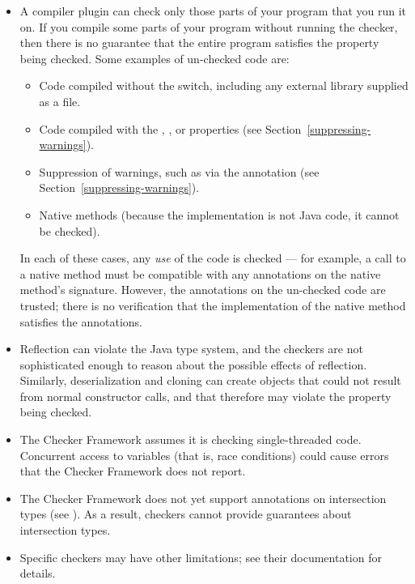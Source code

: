 \begin{itemize}

\item
  A compiler plugin can check only those parts of your program that you run
  it on.  If you compile some parts of your program without running the
  checker, then there is no guarantee that the entire program satisfies the
  property being checked.  Some examples of un-checked code are:

  \begin{itemize}
  \item
    Code compiled without the  switch, including any
    external library supplied as a  file.
  \item
    Code compiled with the , ,  or 
    properties (see Section~\ref{suppressing-warnings}).
  \item
    Suppression of warnings, such as via the 
    annotation (see Section~\ref{suppressing-warnings}).
  \item
    Native methods (because the implementation is not Java code, it cannot
    be checked).
  \end{itemize}

  In each of these cases, any \emph{use} of the code is checked --- for
  example, a call to a native method must be compatible with any
  annotations on the native method's signature.
  However, the annotations on the un-checked code are trusted; there is no
  verification that the implementation of the native method satisfies the
  annotations.

\item
  Reflection can violate the Java type system, and
  the checkers are not sophisticated enough to reason about the possible
  effects of reflection.  Similarly, deserialization and cloning can
  create objects that could not result from normal constructor calls, and
  that therefore may violate the property being checked.

\item
  The Checker Framework assumes it is checking single-threaded code.
  Concurrent access to variables (that is, race conditions) could cause
  errors that the Checker Framework does not report.

\item
  The Checker Framework does not yet support annotations on intersection
  types (see
  ).  As a result, checkers cannot provide guarantees about
  intersection types.

\item
  Specific checkers may have other limitations; see their documentation for
  details.

\end{itemize}

